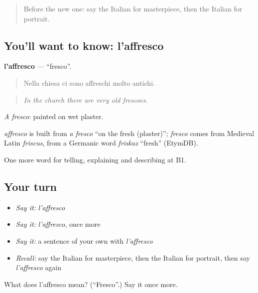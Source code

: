 \begin{quote}
Before the new one: say the Italian for masterpiece, then the Italian for portrait.
\end{quote}

\subsection*{You'll want to know: l'affresco}
\textbf{l'affresco} — \textquotedblleft{}fresco\textquotedblright{}.

\begin{quote}
Nella chiesa ci sono affreschi molto antichi.
\end{quote}

\begin{quote}
\emph{In the church there are very old frescoes.}
\end{quote}

\emph{A fresco}: painted on wet plaster.

\begin{cousinweb}
\emph{affresco} is built from \emph{a fresco} \textquotedblleft{}on the fresh (plaster)\textquotedblright{}; \emph{fresco} comes from Medieval Latin \emph{friscus}, from a Germanic word \emph{friskaz} \textquotedblleft{}fresh\textquotedblright{} (EtymDB).
\end{cousinweb}

\begin{grammarlens}[title={What you've built}]
One more word for telling, explaining and describing at B1.
\end{grammarlens}

\subsection*{Your turn}
\begin{itemize}
\raggedright
  \item \emph{Say it:} \emph{l'affresco}
  \item \emph{Say it:} \emph{l'affresco}, once more
  \item \emph{Say it:} a sentence of your own with \emph{l'affresco}
  \item \emph{Recall:} say the Italian for masterpiece, then the Italian for portrait, then say \emph{l'affresco} again
\end{itemize}

\begin{tcolorbox}[breakable,colback=teal!4,colframe=teal!35!black,title={Before you move on}]
What does l'affresco mean? (\textquotedblleft{}Fresco\textquotedblright{}.) Say it once more.
\end{tcolorbox}

